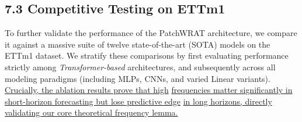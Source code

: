 \documentclass[11pt, letterpaper]{article}
\begin{document}
\subsection{7.3 Competitive Testing on ETTm1}
To further validate the performance of the PatchWRAT architecture, we compare it against a massive suite of twelve state-of-the-art (SOTA) models on the ETTm1 dataset. We stratify these comparisons by first evaluating performance strictly among \textit{Transformer-based} architectures, and subsequently across all modeling paradigms (including MLPs, CNNs, and varied Linear variants). \underline{Crucially, the ablation results prove that high} \underline{frequencies matter significantly in short-horizon forecasting but lose predictive edge} \underline{in long horizons, directly validating our core theoretical frequency lemma.}
\end{document}
